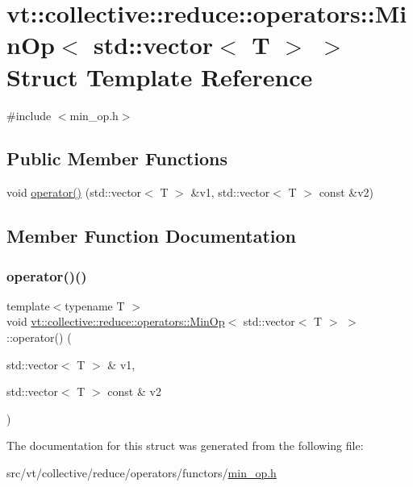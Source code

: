\hypertarget{structvt_1_1collective_1_1reduce_1_1operators_1_1_min_op_3_01std_1_1vector_3_01_t_01_4_01_4}{}\section{vt\+:\+:collective\+:\+:reduce\+:\+:operators\+:\+:Min\+Op$<$ std\+:\+:vector$<$ T $>$ $>$ Struct Template Reference}
\label{structvt_1_1collective_1_1reduce_1_1operators_1_1_min_op_3_01std_1_1vector_3_01_t_01_4_01_4}


{\ttfamily \#include $<$min\+\_\+op.\+h$>$}

\subsection*{Public Member Functions}
\begin{DoxyCompactItemize}
\item 
void \hyperlink{structvt_1_1collective_1_1reduce_1_1operators_1_1_min_op_3_01std_1_1vector_3_01_t_01_4_01_4_ae09254bda381e0407a0b09e04b16779d}{operator()} (std\+::vector$<$ T $>$ \&v1, std\+::vector$<$ T $>$ const \&v2)
\end{DoxyCompactItemize}


\subsection{Member Function Documentation}
\mbox{\label{structvt_1_1collective_1_1reduce_1_1operators_1_1_min_op_3_01std_1_1vector_3_01_t_01_4_01_4_ae09254bda381e0407a0b09e04b16779d}} 
\subsubsection{\texorpdfstring{operator()()}{operator()()}}
{\footnotesize\ttfamily template$<$typename T $>$ \\
void \hyperlink{structvt_1_1collective_1_1reduce_1_1operators_1_1_min_op}{vt\+::collective\+::reduce\+::operators\+::\+Min\+Op}$<$ std\+::vector$<$ T $>$ $>$\+::operator() (\begin{DoxyParamCaption}\item[{std\+::vector$<$ T $>$ \&}]{v1,  }\item[{std\+::vector$<$ T $>$ const \&}]{v2 }\end{DoxyParamCaption})\hspace{0.3cm}{\ttfamily [inline]}}



The documentation for this struct was generated from the following file\+:\begin{DoxyCompactItemize}
\item 
src/vt/collective/reduce/operators/functors/\hyperlink{min__op_8h}{min\+\_\+op.\+h}\end{DoxyCompactItemize}
